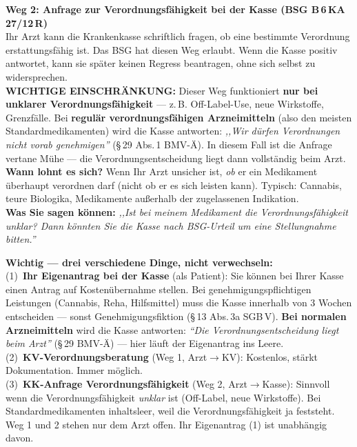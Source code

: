 \documentclass[a4paper]{umbruch-position}
\begin{document}
\begin{infobox}
\textbf{Weg 2: Anfrage zur Verordnungsf\"ahigkeit bei der Kasse (BSG B\,6\,KA\,27/12\,R)}\\
Ihr Arzt kann die Krankenkasse schriftlich fragen, ob eine bestimmte Verordnung erstattungsf\"ahig ist. Das BSG hat diesen Weg erlaubt. Wenn die Kasse positiv antwortet, kann sie sp\"ater keinen Regress beantragen, ohne sich selbst zu widersprechen.\\[4pt]
\textbf{WICHTIGE EINSCHR\"ANKUNG:} Dieser Weg funktioniert \textbf{nur bei unklarer Verordnungsf\"ahigkeit} --- z.\,B. Off-Label-Use, neue Wirkstoffe, Grenzf\"alle. Bei \textbf{regul\"ar verordnungsf\"ahigen Arzneimitteln} (also den meisten Standardmedikamenten) wird die Kasse antworten: \textit{,,Wir d\"urfen Verordnungen nicht vorab genehmigen''} (\S\,29 Abs.\,1 BMV-\"A). In diesem Fall ist die Anfrage vertane M\"uhe --- die Verordnungsentscheidung liegt dann vollst\"andig beim Arzt.\\[4pt]
\textbf{Wann lohnt es sich?} Wenn Ihr Arzt unsicher ist, \textit{ob} er ein Medikament \"uberhaupt verordnen darf (nicht ob er es sich leisten kann). Typisch: Cannabis, teure Biologika, Medikamente au\ss{}erhalb der zugelassenen Indikation.\\[4pt]
\textbf{Was Sie sagen k\"onnen:} \textit{,,Ist bei meinem Medikament die Verordnungsf\"ahigkeit unklar? Dann k\"onnten Sie die Kasse nach BSG-Urteil um eine Stellungnahme bitten.''}
\end{infobox}

\begin{infobox}
\textbf{Wichtig --- drei verschiedene Dinge, nicht verwechseln:}\\
(1)~\textbf{Ihr Eigenantrag bei der Kasse} (als Patient): Sie k\"onnen bei Ihrer Kasse einen Antrag auf Kosten\"ubernahme stellen. Bei genehmigungspflichtigen Leistungen (Cannabis, Reha, Hilfsmittel) muss die Kasse innerhalb von 3 Wochen entscheiden --- sonst Genehmigungsfiktion (\S\,13 Abs.\,3a SGB\,V). \textbf{Bei normalen Arzneimitteln} wird die Kasse antworten: \textit{``Die Verordnungsentscheidung liegt beim Arzt''} (\S\,29 BMV-\"A) --- hier l\"auft der Eigenantrag ins Leere.\\[2pt]
(2)~\textbf{KV-Verordnungsberatung} (Weg 1, Arzt$\to$KV): Kostenlos, st\"arkt Dokumentation. Immer m\"oglich.\\[2pt]
(3)~\textbf{KK-Anfrage Verordnungsf\"ahigkeit} (Weg 2, Arzt$\to$Kasse): Sinnvoll wenn die Verordnungsf\"ahigkeit \textit{unklar} ist (Off-Label, neue Wirkstoffe). Bei Standardmedikamenten inhaltsleer, weil die Verordnungsf\"ahigkeit ja feststeht.\\[2pt]
Weg 1 und 2 stehen nur dem Arzt offen. Ihr Eigenantrag (1) ist unabh\"angig davon.
\end{infobox}
\end{document}
